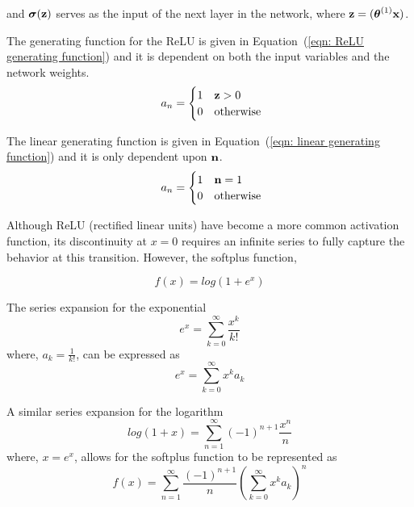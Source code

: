 and $\boldsymbol\sigma (\bold z)$ serves as the input of the next layer in the network, where $\bold z = (\boldsymbol\theta^{(1)} \bold x)$.

The generating function for the ReLU is given in Equation~(\ref{eqn: ReLU generating function}) and it is dependent on both the input variables and the network weights.
\begin{equation}
	\ a_n =
		\begin{cases}
			1 & \bold z > 0 \\
			0 & \text{otherwise}
		\end{cases}
	\label{eqn: ReLU generating function}
\end{equation}

The linear generating function is given in Equation~(\ref{eqn: linear generating function}) and it is only dependent upon $\bold n$.
\begin{equation}
	\ a_n =
		\begin{cases}
			1 & \bold n = 1 \\
			0 & \text{otherwise}
		\end{cases}
	\label{eqn: linear generating function}
\end{equation}

Although ReLU (rectified linear units) have become a more common activation function, its discontinuity at $x = 0$ requires an infinite series to fully capture the behavior at this transition. However, the softplus function,

\begin{equation}
	f(x) = log(1+e^x)
\end{equation}

The series expansion for the exponential
\begin{equation}
	e^x = \sum_{k=0}^\infty \frac{x^k}{k!}
\end{equation}
where, $a_k = \frac{1}{k!}$, can be expressed as
\begin{equation}
	e^x = \sum_{k=0}^\infty x^k a_k
\end{equation}

A similar series expansion for the logarithm
\begin{equation}
	log(1+x) = \sum_{n=1}^\infty (-1)^{n+1} \frac{x^n}{n}
\end{equation}
where, $x = e^x$,
allows for the softplus function to be represented as
\begin{equation}
	f(x) = \sum_{n=1}^\infty \frac{(-1)^{n+1}}{n} (\sum_{k=0}^\infty x^k a_k)^n
\end{equation}

